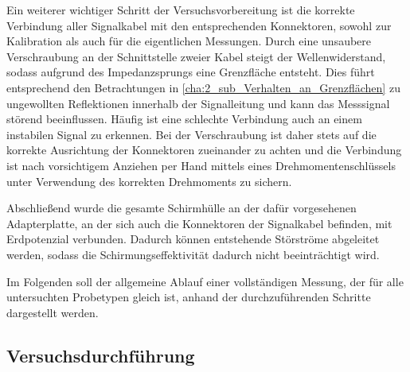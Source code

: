 Ein weiterer wichtiger Schritt der Versuchsvorbereitung ist die korrekte Verbindung aller Signalkabel mit den entsprechenden Konnektoren, sowohl zur Kalibration als auch für die eigentlichen Messungen. Durch eine unsaubere Verschraubung an der Schnittstelle zweier Kabel steigt der Wellenwiderstand, sodass aufgrund des Impedanzsprungs eine Grenzfläche entsteht. Dies führt entsprechend den Betrachtungen in \Abschnitt\ref{cha:2_sub_Verhalten_an_Grenzflächen} zu ungewollten Reflektionen innerhalb der Signalleitung und kann das Messsignal störend beeinflussen. Häufig ist eine schlechte Verbindung auch an einem instabilen Signal zu erkennen. Bei der Verschraubung ist daher stets auf die korrekte Ausrichtung der Konnektoren zueinander zu achten und die Verbindung ist nach vorsichtigem Anziehen per Hand mittels eines Drehmomentenschlüssels unter Verwendung des korrekten Drehmoments zu sichern.
\par
\vspace{\linespace}
Abschließend wurde die gesamte Schirmhülle an der dafür vorgesehenen Adapterplatte, an der sich auch die Konnektoren der Signalkabel befinden, mit Erdpotenzial verbunden. Dadurch können entstehende Störströme abgeleitet werden, sodass die Schirmungseffektivität dadurch nicht beeinträchtigt wird. 
\par
\vspace{\linespace}
Im Folgenden soll der allgemeine Ablauf einer vollständigen Messung, der für alle untersuchten Probetypen gleich ist, anhand der durchzuführenden Schritte dargestellt werden. 


\subsection{Versuchsdurchführung}

